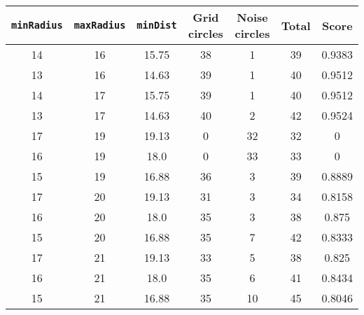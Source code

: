 \documentclass[letterpaper, 12pt]{article}
\begin{document}
\begin{longtable}{|c|c|c|c|c|c|c|}
\hline
\textbf{\texttt{minRadius}} & \textbf{\texttt{maxRadius}} & \textbf{\texttt{minDist}} & \textbf{Grid circles} & \textbf{Noise circles} & \textbf{Total} & \textbf{Score} \\
\hline
14 & 16 & 15.75 & 38 & 1 & 39 & 0.9383 \\
\hline
13 & 16 & 14.63 & 39 & 1 & 40 & 0.9512 \\
\hline
14 & 17 & 15.75 & 39 & 1 & 40 & 0.9512 \\
\hline
13 & 17 & 14.63 & 40 & 2 & 42 & 0.9524 \\
\hline
17 & 19 & 19.13 & 0 & 32 & 32 & 0 \\
\hline
16 & 19 & 18.0 & 0 & 33 & 33 & 0 \\
\hline
15 & 19 & 16.88 & 36 & 3 & 39 & 0.8889 \\
\hline
17 & 20 & 19.13 & 31 & 3 & 34 & 0.8158 \\
\hline
16 & 20 & 18.0 & 35 & 3 & 38 & 0.875 \\
\hline
15 & 20 & 16.88 & 35 & 7 & 42 & 0.8333 \\
\hline
17 & 21 & 19.13 & 33 & 5 & 38 & 0.825 \\
\hline
16 & 21 & 18.0 & 35 & 6 & 41 & 0.8434 \\
\hline
15 & 21 & 16.88 & 35 & 10 & 45 & 0.8046 \\
\hline
\end{longtable}
\end{document}

